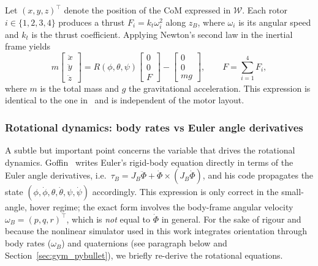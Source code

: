 \documentclass[11pt,a4paper]{article}
\theoremstyle{remark}
\numberwithin{equation}{section}
\begin{document}
Let $(x, y, z)^\top$ denote the position of the CoM expressed in $\mathcal{W}$. Each rotor
$i \in \{1,2,3,4\}$ produces a thrust $F_i = k_t \omega_i^2$ along $z_B$, where $\omega_i$ is
its angular speed and $k_t$ is the thrust coefficient. Applying Newton's second law in the
inertial frame yields
\begin{equation}
m \begin{bmatrix} \ddot{x} \\ \ddot{y} \\ \ddot{z} \end{bmatrix}
   = R(\phi,\theta,\psi) \begin{bmatrix} 0 \\ 0 \\ F \end{bmatrix}
   - \begin{bmatrix} 0 \\ 0 \\ m g \end{bmatrix},
\qquad F = \sum_{i=1}^{4} F_i,
\label{eq:translational}
\end{equation}
where $m$ is the total mass and $g$ the gravitational acceleration. This expression is
identical to the one in~\cite{goffin2026} and is independent of the motor layout.

\subsubsection*{Rotational dynamics: body rates vs Euler angle derivatives}

A subtle but important point concerns the variable that drives the rotational dynamics.
Goffin~\cite{goffin2026} writes Euler's rigid-body equation directly in terms of the
Euler angle derivatives, i.e.\ $\tau_B = J_B \ddot{\Phi} + \dot{\Phi} \times
(J_B \dot{\Phi})$, and his code propagates the state $(\phi, \dot\phi, \theta, \dot\theta,
\psi, \dot\psi)$ accordingly. This expression is only correct in the small-angle, hover
regime; the exact form involves the body-frame angular velocity $\omega_B = (p, q, r)^\top$,
which is \emph{not} equal to $\dot{\Phi}$ in general. For the sake of rigour and because the
nonlinear simulator used in this work integrates orientation through body rates ($\omega_B$) and
quaternions (see paragraph below and Section~\ref{sec:gym_pybullet}), we briefly re-derive
the rotational equations.
\end{document}
